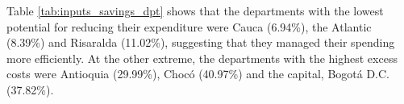 \documentclass[11pt,a4paper,oneside]{article}
\begin{document}


Table \ref{tab:inputs_savings_dpt} shows that the departments with the lowest potential for reducing their expenditure were Cauca (6.94\%), the Atlantic (8.39\%) and Risaralda (11.02\%), suggesting that they managed their spending more efficiently. At the other extreme, the departments with the highest excess costs were Antioquia (29.99\%), Choc\'o (40.97\%) and the capital, Bogot\'a D.C. (37.82\%).


\color{blue}
\end{document}
